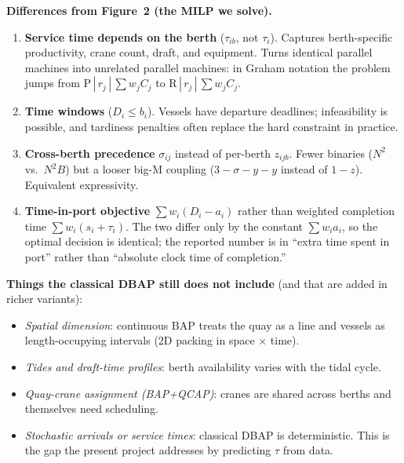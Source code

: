 \documentclass[11pt]{article}
\begin{document}
\noindent\textbf{Differences from Figure~2 (the MILP we solve).}
\begin{enumerate}[leftmargin=2em, itemsep=1pt]
  \item \textbf{Service time depends on the berth} ($\tau_{ib}$, not
        $\tau_i$). Captures berth-specific productivity, crane count,
        draft, and equipment. Turns identical parallel machines into
        unrelated parallel machines: in Graham notation the problem
        jumps from $\mathrm{P}\,|\,r_j\,|\,\sum w_j C_j$ to
        $\mathrm{R}\,|\,r_j\,|\,\sum w_j C_j$.
  \item \textbf{Time windows} ($D_i \leq b_i$). Vessels have departure
        deadlines; infeasibility is possible, and tardiness penalties
        often replace the hard constraint in practice.
  \item \textbf{Cross-berth precedence} $\sigma_{ij}$ instead of
        per-berth $z_{ijb}$. Fewer binaries ($N^2$ vs.\ $N^2 B$) but a
        looser big-M coupling ($3 -\sigma -y -y$ instead of
        $1-z$). Equivalent expressivity.
  \item \textbf{Time-in-port objective} $\sum w_i (D_i - a_i)$ rather
        than weighted completion time $\sum w_i (s_i + \tau_i)$. The
        two differ only by the constant $\sum w_i a_i$, so the
        optimal decision is identical; the reported number is in
        ``extra time spent in port'' rather than ``absolute clock
        time of completion.''
\end{enumerate}

\vspace{0.4em}

\noindent\textbf{Things the classical DBAP still does not include}
(and that are added in richer variants):
\begin{itemize}[leftmargin=2em, itemsep=1pt]
  \item \emph{Spatial dimension}: continuous BAP treats the quay as a
        line and vessels as length-occupying intervals (2D packing in
        space $\times$ time).
  \item \emph{Tides and draft-time profiles}: berth availability
        varies with the tidal cycle.
  \item \emph{Quay-crane assignment (BAP+QCAP)}: cranes are shared
        across berths and themselves need scheduling.
  \item \emph{Stochastic arrivals or service times}: classical DBAP is
        deterministic. This is the gap the present project addresses
        by predicting $\tau$ from data.
\end{itemize}
\end{document}
